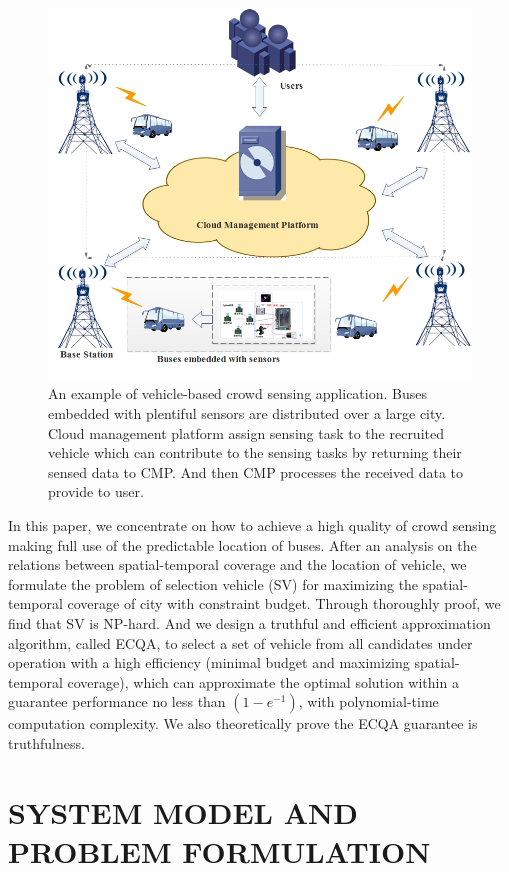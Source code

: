 \documentclass[journal]{IEEEtran}
\begin{document}
\begin{figure}[t]
	\centering
	\includegraphics[width=1.0\linewidth]{Figure1.png}
	\caption[Fig.1]{An example of vehicle-based crowd sensing application. Buses embedded with plentiful sensors are distributed over a large city. Cloud management platform assign sensing task to the recruited vehicle which can contribute to the sensing tasks by returning their sensed data to CMP. And then CMP processes the received data to provide to user.}
	\label{Figure1}
\end{figure}

In this paper, we concentrate on how to achieve a high quality of crowd sensing making full use of the predictable location of buses. After an analysis on the relations between spatial-temporal coverage and the location of vehicle, we formulate the problem of selection vehicle (SV) for maximizing the spatial-temporal coverage of city with constraint budget. Through thoroughly proof, we find that SV is NP-hard. And we design a truthful and efficient approximation algorithm, called ECQA, to select a set of vehicle from all candidates under operation with a high efficiency (minimal budget and maximizing spatial-temporal coverage), which can approximate the optimal solution within a guarantee performance no less than $\left ( 1-e^{-1} \right )$, with polynomial-time computation complexity. We also theoretically prove the ECQA guarantee is truthfulness.


\section{SYSTEM MODEL AND PROBLEM FORMULATION}
\end{document}
